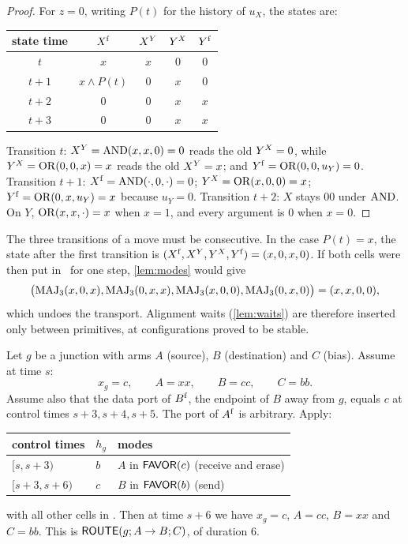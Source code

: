 \begin{proof}
For $z=0$, writing $P(t)$ for the history of $u_X$, the states are:
\begin{center}\small
\begin{tabular}{ccccc}\toprule
state time & $X^{\mathrm f}$ & $X^{Y}$ & $Y^{X}$ & $Y^{\mathrm f}$\\\midrule
$t$   & $x$ & $x$ & $0$ & $0$\\
$t+1$ & $x\wedge P(t)$ & $0$ & $x$ & $0$\\
$t+2$ & $0$ & $0$ & $x$ & $x$\\
$t+3$ & $0$ & $0$ & $x$ & $x$\\\bottomrule
\end{tabular}
\end{center}
Transition $t$: $X^{Y}=\operatorname{AND}(x,x,0)=0$ reads the old $Y^{X}=0$, while $Y^{X}=\operatorname{OR}(0,0,x)=x$ reads the
old $X^{Y}=x$; and $Y^{\mathrm f}=\operatorname{OR}(0,0,u_Y)=0$.
Transition $t+1$: $X^{\mathrm f}=\operatorname{AND}(\cdot,0,\cdot)=0$; $Y^{X}=\operatorname{OR}(x,0,0)=x$;
$Y^{\mathrm f}=\operatorname{OR}(0,x,u_Y)=x$ because $u_Y=0$.
Transition $t+2$: $X$ stays $00$ under $\operatorname{AND}$. On $Y$, $\operatorname{OR}(x,x,\cdot)=x$ when $x=1$, and every
argument is $0$ when $x=0$.
\end{proof}

\begin{remark}\label{rem:nopause}
The three transitions of a move must be consecutive. In the case $P(t)=x$, the state after the
first transition is $(X^{\mathrm f},X^{Y},Y^{X},Y^{\mathrm f})=(x,0,x,0)$. If both cells were then
put in \HOLD\ for one step, \cref{lem:modes} would give
\[
\bigl(\operatorname{MAJ}_3(x,0,x),\operatorname{MAJ}_3(0,x,x),\operatorname{MAJ}_3(x,0,0),\operatorname{MAJ}_3(0,x,0)\bigr)=(x,x,0,0),
\]
which undoes the transport. Alignment waits (\cref{lem:waits}) are therefore inserted only between
primitives, at configurations proved to be stable.
\end{remark}

\begin{lemma}\label{lem:route}
Let $g$ be a junction with arms $A$ (source), $B$ (destination) and $C$ (bias). Assume at time $s$:
\[
x_g=c,\qquad A=xx,\qquad B=cc,\qquad C=bb.
\]
Assume also that the data port of $B^{\mathrm f}$, the endpoint of $B$ away from $g$, equals $c$ at
control times $s+3,s+4,s+5$. The port of $A^{\mathrm f}$ is arbitrary. Apply:
\begin{center}\small
\begin{tabular}{lll}\toprule
control times & $h_g$ & modes\\\midrule
$[s,s+3)$ & $b$ & $A$ in $\textsf{FAVOR}(c)$ (receive and erase)\\
$[s+3,s+6)$ & $c$ & $B$ in $\textsf{FAVOR}(b)$ (send)\\\bottomrule
\end{tabular}
\end{center}
with all other cells in \HOLD. Then at time $s+6$ we have $x_g=c$, $A=cc$, $B=xx$ and $C=bb$. This is
$\textsf{ROUTE}(g;A\to B;C)$, of duration $6$.
\end{lemma}

